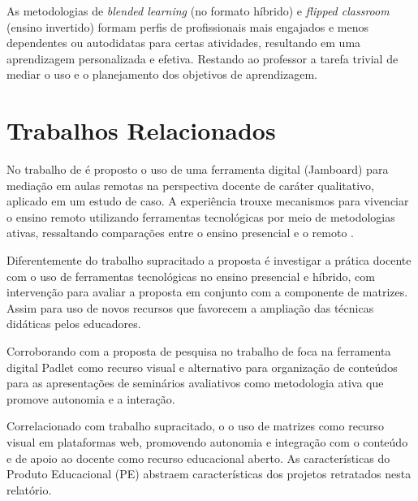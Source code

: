 As metodologias de \textit{blended learning} (no formato híbrido) e \textit{flipped classroom} (ensino invertido) formam perfis de profissionais mais engajados e menos dependentes ou autodidatas para certas atividades, resultando em uma aprendizagem personalizada e efetiva. Restando ao professor a tarefa trivial de mediar o uso e o planejamento dos objetivos de aprendizagem.




















\section{Trabalhos Relacionados}
\label{trabalhos_relacionados}

No trabalho de  é proposto o uso de uma ferramenta digital (Jamboard) para mediação em aulas remotas na perspectiva docente de caráter qualitativo, aplicado em um estudo de caso. A experiência trouxe mecanismos para vivenciar o ensino remoto utilizando ferramentas tecnológicas por meio de metodologias ativas, ressaltando comparações entre o ensino presencial e o remoto \cite{florencio2021perspectivas}.

Diferentemente do trabalho supracitado a proposta é investigar a prática docente com o uso de ferramentas tecnológicas no ensino presencial e híbrido, com intervenção para avaliar a proposta em conjunto com a componente de matrizes. Assim para uso de novos recursos que favorecem   a   ampliação   das   técnicas   didáticas   pelos   educadores.

Corroborando com a proposta de pesquisa no trabalho de  foca na ferramenta digital Padlet como recurso visual e alternativo para organização de conteúdos para as apresentações de seminários avaliativos como metodologia ativa que promove autonomia e a interação.

Correlacionado com trabalho supracitado, o o uso de matrizes como recurso visual em plataformas web, promovendo autonomia e integração com o conteúdo e de apoio ao docente como recurso educacional aberto. As características do Produto Educacional (PE) abstraem características dos projetos retratados nesta relatório.









